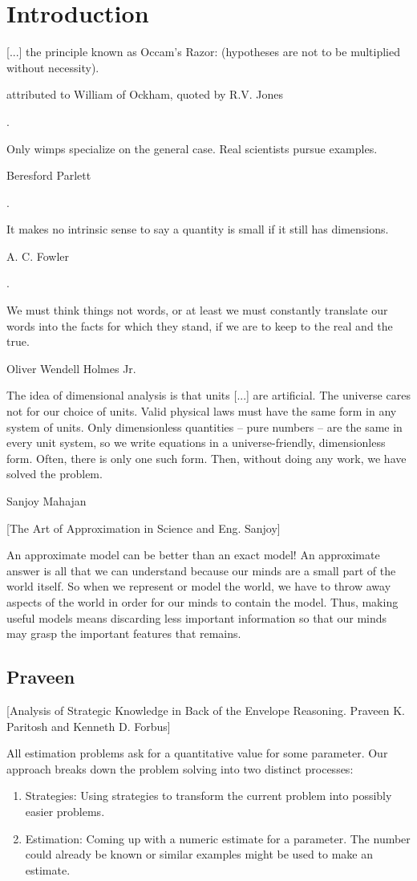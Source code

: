 \section{Introduction}
\newcommand{\lpos}{x} %
\newcommand{\lvel}{v} %
%
\epigraph{[...] the principle known as Occam's Razor:  (hypotheses are not to be multiplied without necessity).}{attributed to William of Ockham, quoted by R.V. Jones}{\citep[p.95]{gibbings:2011}.}
%
\epigraph{Only wimps specialize on the general case. Real scientists pursue examples.}{Beresford Parlett}{\citep{berry:1995}.}
%
\epigraph{It makes no intrinsic sense to say a quantity is small if it still has dimensions.}{A. C. Fowler}{\citep{fowler:2003}.}
%
\epigraph{We must think things not words, or at least we must constantly translate our words into the facts for which they stand, if we are to keep to the real and the true.}{Oliver Wendell Holmes Jr.}{\citep{holmes:1899}}
%
\epigraph{The idea of dimensional analysis is that units [...] are artificial. The universe cares not for our choice of units. Valid physical laws must have the same form in any system of units. Only dimensionless quantities -- pure numbers -- are the same in every unit system, so we write equations in a universe-friendly, dimensionless form. Often, there is only one such form. Then, without doing any work, we have solved the problem.}{Sanjoy Mahajan}{\citep{sanjoy:1998}}

[The Art of Approximation in Science and Eng. Sanjoy]

An approximate model can be better than an exact model! An approximate answer is all that we can understand because our minds are a small part of the world itself. So when we represent or model the world, we have to throw away aspects of the world in order for our minds to contain the model. Thus, making useful models means discarding less important information so that our minds may grasp the important features that remains.


\subsection{Praveen}
[Analysis of Strategic Knowledge in Back of the Envelope Reasoning. Praveen K. Paritosh and Kenneth D. Forbus]

All estimation problems ask for a quantitative value for some parameter. Our approach breaks down the problem solving into two distinct processes:
%
\begin{enumerate}
\item Strategies: Using strategies to transform the current problem into possibly easier problems.
\item Estimation: Coming up with a numeric estimate for a parameter. The number could already be known or similar examples might be used to make an estimate.
\end{enumerate}

